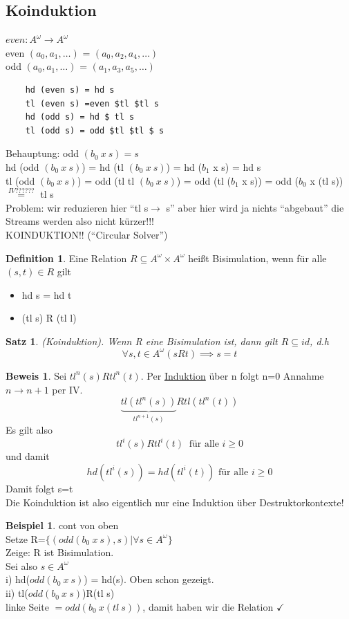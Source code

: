 \documentclass{article}
\newtheorem{satz}{Satz}
\theoremstyle{definition}
\newtheorem{beweis}{Beweis}[section]
\newtheorem{beispiel}{Beispiel}[section]
\newtheorem{definition}{Definition}[section]
\begin{document}
	\subsection{Koinduktion}
	$even:A^\omega \to A^\omega$\\
	even $(a_0, a_1, \dots)$ = $(a_0,a_2,a_4,\dots)$\\
	odd $(a_0, a_1, \dots)$ = $(a_1,a_3,a_5,\dots)$\\
	\begin{verbatim}
	hd (even s) = hd s
	tl (even s) =even $tl $tl s
	hd (odd s) = hd $ tl s
	tl (odd s) = odd $tl $tl $ s
	\end{verbatim}
	Behauptung: odd $(b_0\ x\ s) = s$\\
	hd (odd $(b_0\ x\ s)$) = hd (tl $(b_0\ x \ s)$) = hd ($b_1$ x s) = hd s\\
	tl (odd $(b_0\ x\ s)$) = odd (tl tl $(b_0\ x\ s)$) = odd (tl ($b_1$ x s)) = odd ($b_0$ x (tl s)) $\stackrel{IV??????}{=}$ tl s\\
	Problem: wir reduzieren hier ``tl s$\to$ s'' aber hier wird ja nichts ``abgebaut'' die Streams werden also nicht kürzer!!!\\
	KOINDUKTION!! (``Circular Solver'')\\
	\begin{definition} Eine Relation $R\subseteq A^\omega\times A^\omega$ heißt Bisimulation, wenn für alle $(s,t)\in R$ gilt\\
	\begin{itemize}
		\item hd s = hd t
		\item (tl s) R (tl l)
	\end{itemize}
	\end{definition}
	\begin{satz} (Koinduktion). Wenn R eine Bisimulation ist, dann gilt $R\subseteq id$, d.h
	\[\forall s,t\in A^\omega (sRt)\implies s=t\]
	\end{satz}
	\begin{beweis} Sei $tl^n(s)Rtl^n(t)$. Per \underline{Induktion} über n folgt
	n=0 Annahme\\
	$n\to n+1$ per IV.
	\[\underbrace{tl(tl^n(s))}_{tl^{n+1}(s)}Rtl(tl^n(t))\]
	Es gilt also
	\[tl^i(s)Rtl^i(t)\ \text{ für alle }i\geq 0\]
	und damit
	\[hd(tl^i(s))=hd(tl^i(t))\text{ für alle } i\geq 0\]
	Damit folgt s=t\\
	Die Koinduktion ist also eigentlich nur eine Induktion über Destruktorkontexte!
	\end{beweis}
	\begin{beispiel} cont von oben\\
	Setze R=$\{(odd(b_0\ x\ s),s)|\forall s \in A^\omega\}$\\
	Zeige: R ist Bisimulation.\\
	Sei also $s\in A^\omega$\\
	i) hd($odd(b_0\ x\ s) $) = hd(s). Oben schon gezeigt.\\
	ii) tl($odd(b_0\ x\ s)$)R(tl s)\\
	linke Seite $=odd(b_0\ x (tl\ s))$, damit haben wir die Relation $\checkmark$
	\end{beispiel}
\end{document}
